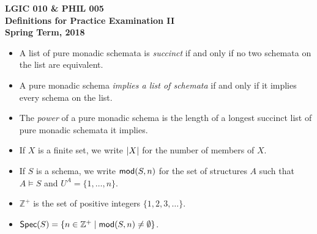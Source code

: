 \documentclass[12pt]{article}
\begin{document}
\pagestyle{empty}
\begin{center}
{\bf
LGIC 010 \& PHIL 005 \\ 
Definitions for Practice Examination II  \\
Spring Term, 2018\\
}
\end{center}
\begin{itemize}
\item 
A list of pure monadic schemata is \textit{succinct} if and only if no two schemata on the list are equivalent. 
\item 
A pure monadic schema \textit{implies a list of schemata} if and only if it implies every schema on the list.
\item 
The \textit{power} of a pure monadic schema is the length of a longest succinct list of pure monadic schemata it implies.
\item
If $X$ is a finite set, we write $\mbox{$|X|$}$ for the number of members of $X$.
\item
If $S$ is a schema, we write $\mbox{$\mathsf{mod}(S,n)$}$ for the set of structures $A$ such that $A\models S$ and $U^A=\{1,\ldots, n\}.$
\item
$\mathbb{Z}^+$ is the set of positive integers $\{1,2,3,\ldots\}$. 
\item
$\mbox{$\mathsf{Spec}(S)$}=\{n\in \mathbb{Z}^+\mid \mbox{$\mathsf{mod}(S,n)$}\neq\emptyset\}$.
\end{itemize}
\end{document}

